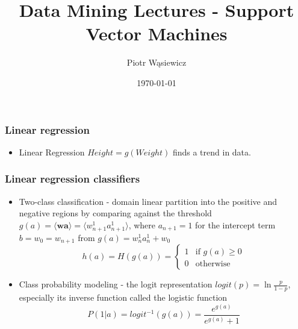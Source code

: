 \documentclass[proffesionalfonts]{beamer}
\title[EARIN]{Data Mining Lectures - Support Vector Machines}
\author{Piotr Wąsiewicz}
\institute[ICS PW]
{
Institute of Computer Science\\
\medskip
{\emph{pwasiewi@elka.pw.edu.pl}}
}
\date{\today}
\begin{document}
\lstset{language=R}

\begin{frame}
\titlepage
\end{frame}

\loadedtable

\begin{frame}
\frametitle{Linear regression}
\begin{block}{}
\begin{itemize}
\item[\ ] Linear Regression $Height=g(Weight)$ finds a trend in data.
\end{itemize}
\end{block}
\end{frame}

\begin{frame}
\frametitle{Linear regression classifiers}
\begin{itemize}
\item Two-class classification - domain linear partition into the positive and negative regions by comparing against the threshold $g(a)=\langle \mathbf w \mathbf a \rangle = \langle w_{n+1}^1 a_{n+1}^1\rangle$, where $a_{n+1}=1$ for the intercept term $b=w_0=w_{n+1}$ from $g(a)=w_n^1a_n^1+w_0$
\[
h(a) = H(g(a)) = \left\{\begin{matrix} 1  & \text{if\ } g(a) \geq 0 \\ 0 & \text{otherwise} \end{matrix}\right.
\]
\item Class probability modeling - the logit representation $logit(p)=\ln{\frac{p}{1-p}}$, especially its inverse function called the logistic function
\[
P(1|a)=logit^{-1}(g(a))=\frac{e^{g(a)}}{e^{g(a)}+1}
\]
\end{itemize}
\end{frame}
\end{document}
